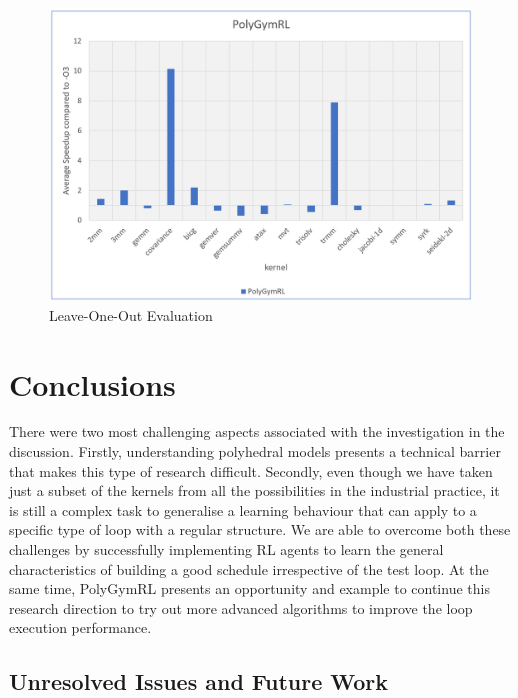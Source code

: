 \documentclass[logo,msc]{infthesis}           %
\begin{document}
\begin{figure}[htbp]
  \centering
  \includegraphics[width=\textwidth]{Images/Results_Basic.png}    
  \caption{Leave-One-Out Evaluation}
  \label{fig:result_basic}
\end{figure}

\chapter{Conclusions}

There were two most challenging aspects associated with the investigation in the discussion. Firstly, understanding polyhedral models presents a technical barrier that makes this type of research difficult. Secondly, even though we have taken just a subset of the kernels from all the possibilities in the industrial practice, it is still a complex task to generalise a learning behaviour that can apply to a specific type of loop with a regular structure. We are able to overcome both these challenges by successfully implementing RL agents to learn the general characteristics of building a good schedule irrespective of the test loop. At the same time, PolyGymRL presents an opportunity and example to continue this research direction to try out more advanced algorithms to improve the loop execution performance.

\section{Unresolved Issues and Future Work}
\end{document}
